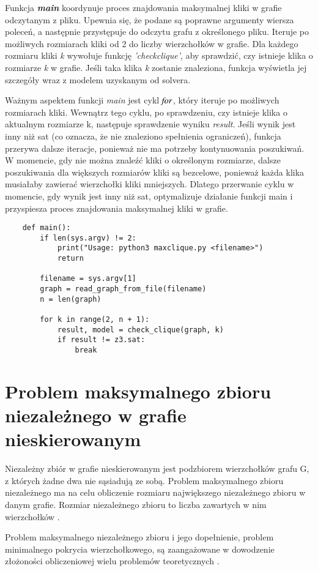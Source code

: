 Funkcja \textit{\textbf{main}} koordynuje proces znajdowania maksymalnej kliki w grafie odczytanym z pliku. Upewnia się, że podane są poprawne argumenty wiersza poleceń, a następnie przystępuje do odczytu grafu z określonego pliku. Iteruje po możliwych rozmiarach kliki od 2 do liczby wierzchołków w grafie. Dla każdego rozmiaru kliki \textit{k} wywołuje funkcję \textit{'check\textunderscore clique'}, aby sprawdzić, czy istnieje klika o rozmiarze \textit{k} w grafie. Jeśli taka klika \textit{k} zostanie znaleziona, funkcja wyświetla jej szczegóły wraz z modelem uzyskanym od solvera. 

Ważnym aspektem funkcji \textit{main} jest cykl $\mathit{for}$, który iteruje po możliwych rozmiarach kliki. Wewnątrz tego cyklu, po sprawdzeniu, czy istnieje klika o aktualnym rozmiarze k, następuje sprawdzenie wyniku \textit{result}. Jeśli wynik jest inny niż sat (co oznacza, że nie znaleziono spełnienia ograniczeń), funkcja przerywa dalsze iteracje, ponieważ nie ma potrzeby kontynuowania poszukiwań. W momencie, gdy nie można znaleźć kliki o określonym rozmiarze, dalsze poszukiwania dla większych rozmiarów kliki są bezcelowe, ponieważ każda klika musiałaby zawierać wierzchołki kliki mniejszych. Dlatego przerwanie cyklu w momencie, gdy wynik jest inny niż sat, optymalizuje działanie funkcji main i przyspiesza proces znajdowania maksymalnej kliki w grafie.

\begin{lstlisting}
	def main():
		if len(sys.argv) != 2:
			print("Usage: python3 maxclique.py <filename>")
			return
		
		filename = sys.argv[1]
		graph = read_graph_from_file(filename)
		n = len(graph)
		
		for k in range(2, n + 1):
			result, model = check_clique(graph, k)
			if result != z3.sat:
				break
\end{lstlisting}


\section{Problem maksymalnego zbioru niezależnego w grafie nieskierowanym}
Niezależny zbiór w grafie nieskierowanym jest podzbiorem wierzchołków grafu G, z których żadne dwa nie sąsiadują ze sobą. Problem maksymalnego zbioru niezależnego ma na celu obliczenie rozmiaru największego niezależnego zbioru w danym grafie. Rozmiar niezależnego zbioru to liczba zawartych w nim wierzchołków \cite{Korshunov1974}.

Problem maksymalnego niezależnego zbioru i jego dopełnienie, problem minimalnego pokrycia wierzchołkowego, są zaangażowane w dowodzenie złożoności obliczeniowej wielu problemów teoretycznych \cite{Skiena20}.

